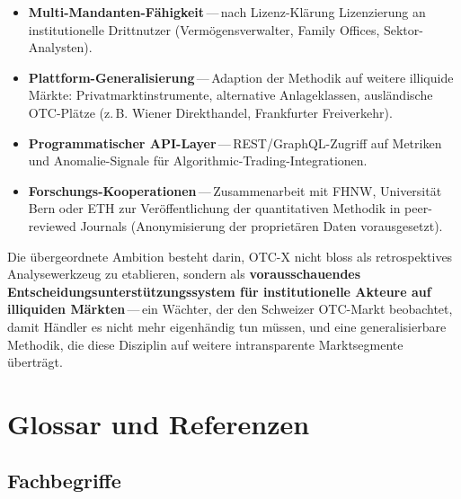 \documentclass[11pt, a4paper, oneside, openany]{report}
\begin{document}
\begin{itemize}
  \item \textbf{Multi-Mandanten-Fähigkeit}\,---\,nach Lizenz-Klärung Lizenzierung an institutionelle Drittnutzer (Vermögensverwalter, Family Offices, Sektor-Analysten).
  \item \textbf{Plattform-Generalisierung}\,---\,Adaption der Methodik auf weitere illiquide Märkte: Privatmarktinstrumente, alternative Anlageklassen, ausländische OTC-Plätze (z.\,B. Wiener Direkthandel, Frankfurter Freiverkehr).
  \item \textbf{Programmatischer API-Layer}\,---\,REST/GraphQL-Zugriff auf Metriken und Anomalie-Signale für Algorithmic-Trading-Integrationen.
  \item \textbf{Forschungs-Kooperationen}\,---\,Zusammenarbeit mit FHNW, Universität Bern oder ETH zur Veröffentlichung der quantitativen Methodik in peer-reviewed Journals (Anonymisierung der proprietären Daten vorausgesetzt).
\end{itemize}

\begin{insightbox}
Die übergeordnete Ambition besteht darin, OTC-X nicht bloss als retrospektives Analysewerkzeug zu etablieren, sondern als \textbf{vorausschauendes Entscheidungsunterstützungssystem für institutionelle Akteure auf illiquiden Märkten}\,---\,ein Wächter, der den Schweizer OTC-Markt beobachtet, damit Händler es nicht mehr eigenhändig tun müssen, und eine generalisierbare Methodik, die diese Disziplin auf weitere intransparente Marktsegmente überträgt.
\end{insightbox}


\chapter{Glossar und Referenzen}
\label{ch:glossar}

\section{Fachbegriffe}
\end{document}
